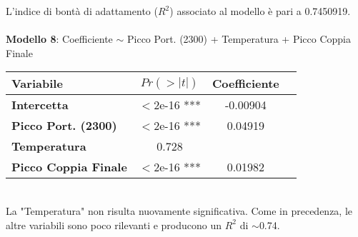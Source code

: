 \documentclass[fleqn,10pt]{SelfArx} %
\begin{document}
L'indice di bontà di adattamento ($R^2$) associato al modello è pari a 0.7450919.\\
\\
\textbf{Modello 8}: Coefficiente $\sim$ Picco Port. (2300) + Temperatura + Picco Coppia Finale
{\begin{table}[h] 
\centering
\begin{tabular}[t]{lccc}
\toprule 
Variabile&$Pr(> |t|)$&Coefficiente\\
\midrule 
\textbf{Intercetta}&$<$2e-16 ***&-0.00904\\ 
\textbf{Picco Port. (2300)}&$<$2e-16 ***&0.04919\\
\textbf{Temperatura}&0.728\\
\textbf{Picco Coppia Finale}&$<$2e-16 ***&0.01982\\
\bottomrule 
\end{tabular}
\end{table}}\\
La "Temperatura" non risulta nuovamente significativa. Come in precedenza, le altre variabili sono poco rilevanti e producono un $R^2$ di $\sim$0.74.
\end{document}
